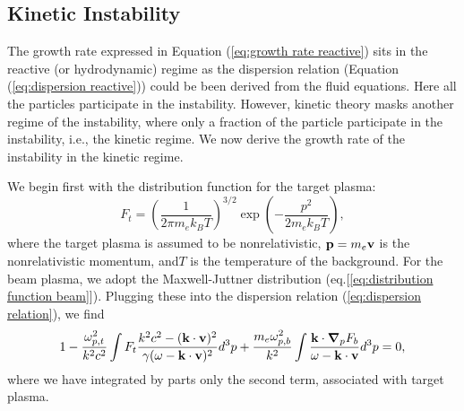 \documentclass[usenatbib,iop,apj]{emulateapj}
\newcommand\bmath[1] {\mbox{\boldmath$\rm #1$}}
\newcommand{\vel}{\ensuremath{\bmath{v}}}
\newcommand{\pmom}{\ensuremath{\bmath{p}}}
\newcommand{\gradp}{\ensuremath{\bmath{\nabla}_p}}
\newcommand{\betavec}{\ensuremath{\bmath{\beta}}}
\newcommand{\kvec}{\ensuremath{\bmath{k}}}
\newcommand{\betabeam}{\ensuremath{\bmath{\beta}_{\rm b}}}
\newcommand{\gammabeam}{\ensuremath{\gamma_{\rm b}}}
\begin{document}
\subsection{Kinetic Instability}

The growth rate expressed in Equation (\ref{eq:growth rate reactive}) sits in the reactive (or hydrodynamic) regime as the dispersion relation (Equation (\ref{eq:dispersion reactive})) could be been derived from the fluid equations.  Here all the particles participate in the instability.  However, kinetic theory masks another regime of the instability, where only a fraction of the particle participate in the instability, i.e., the kinetic regime.  We now derive the growth rate of the instability in the kinetic regime.  

We begin first with the distribution function for the target plasma:
\begin{equation}
 F_t = \left(\frac{1}{2\pi m_e k_B T}\right)^{3/2}\exp\left(-\frac{p^2}{2m_e k_B T}\right),
\end{equation}
where the target plasma is assumed to be nonrelativistic, $\bmath{p}=m_e\vel$ is the nonrelativistic momentum,  and$T$ is the temperature of the background.
For the beam plasma, we adopt the Maxwell-Juttner distribution (eq.[\ref{eq:distribution function beam}]).
Plugging these into the dispersion relation (\ref{eq:dispersion relation}), we find
\begin{equation}\label{eq:dispersion kinetic}
 1 - \frac{\omega_{p,t}^2}{k^2c^2}\int F_t\frac{k^2c^2 - (\kvec\cdot\vel)^2}{\gamma(\omega - \kvec\cdot\vel)^2} d^3p + \frac{m_e\omega_{p,b}^2}{k^2}\int \frac{\kvec\cdot\gradp F_b}{\omega - \kvec\cdot\vel}d^3p  = 0,
\end{equation}
where we have integrated by parts only the second term, associated with target plasma.  
\end{document}
